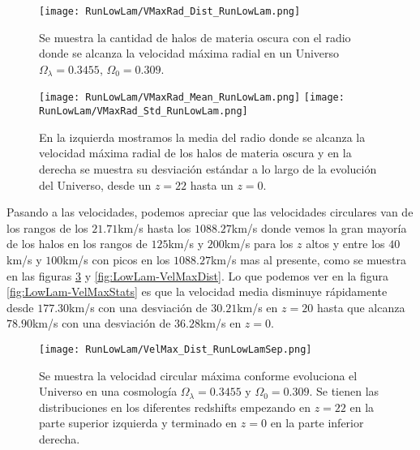 \begin{figure}[H]
    \centering
    \texttt{[image: RunLowLam/VMaxRad\_Dist\_RunLowLam.png]}
    \caption[Distribución del radio donde se alcanza la velocidad máxima radial]{\footnotesize Se muestra la cantidad de halos de materia oscura con el radio donde se alcanza la velocidad máxima radial en un Universo $\Omega_\lambda = 0.3455$, $\Omega_0 = 0.309$.}
    \label{fig:LowLam-VMaxRadDist}
\end{figure}

\begin{figure}[H]
    \centering
    \texttt{[image: RunLowLam/VMaxRad\_Mean\_RunLowLam.png]}
    \texttt{[image: RunLowLam/VMaxRad\_Std\_RunLowLam.png]}
    \caption[Media y desviación estándar del Radio donde se alcanza la velocidad máxima radial]{\footnotesize En la izquierda mostramos la media del radio donde se alcanza la velocidad máxima radial de los halos de materia oscura y en la derecha se muestra su desviación estándar a lo largo de la evolución del Universo, desde un $z=22$ hasta un $z=0$.}
    \label{fig:LowLam-VMaxRadStats}
\end{figure}

Pasando a las velocidades, podemos apreciar que las velocidades circulares van de los rangos de los $21.71$km/s hasta los $1088.27$km/s donde vemos la gran mayoría de los halos en los rangos de $125$km/s y $200$km/s para los $z$ altos y entre los $40$km/s y $100$km/s con picos en los $1088.27$km/s mas al presente, como se muestra en las figuras \ref{fig:LowLam-VelMaxDistSep} y \ref{fig:LowLam-VelMaxDist}. Lo que podemos ver en la figura \ref{fig:LowLam-VelMaxStats} es que la velocidad media disminuye rápidamente desde $177.30$km/s con una desviación de $30.21$km/s en $z=20$ hasta que alcanza $78.90$km/s con una desviación de $36.28$km/s en $z=0$.

\begin{figure}[H]
    \centering
    \texttt{[image: RunLowLam/VelMax\_Dist\_RunLowLamSep.png]}
    \caption[Velocidad circular máxima]{\footnotesize Se muestra la velocidad circular máxima conforme evoluciona el Universo en una cosmología $\Omega_\lambda = 0.3455$ y $\Omega_0 = 0.309$. Se tienen las distribuciones en los diferentes redshifts empezando en $z=22$ en la parte superior izquierda y terminado en $z=0$ en la parte inferior derecha.}
    \label{fig:LowLam-VelMaxDistSep}
\end{figure}

